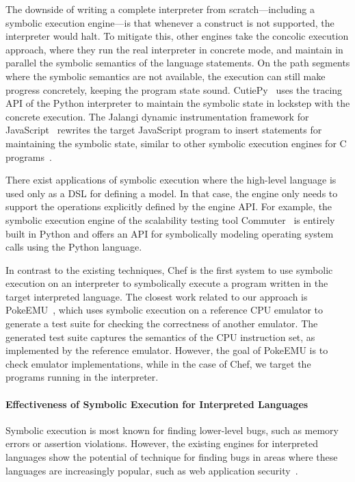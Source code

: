 The downside of writing a complete interpreter from scratch---including a symbolic execution engine---is that whenever a construct is not supported, the interpreter would halt.  To mitigate this, other engines take the concolic execution approach, where they run the real interpreter in concrete mode, and maintain in parallel the symbolic semantics of the language statements.  On the path segments where the symbolic semantics are not available, the execution can still make progress concretely, keeping the program state sound.  CutiePy~\cite{cutie-py} uses the tracing API of the Python interpreter to maintain the symbolic state in lockstep with the concrete execution.  The Jalangi dynamic instrumentation framework for JavaScript~\cite{jalangi} rewrites the target JavaScript program to insert statements for maintaining the symbolic state, similar to other symbolic execution engines for C programs~\cite{dart,cute,exe}.

There exist applications of symbolic execution where the high-level language is used only as a DSL for defining a model.  In that case, the engine only needs to support the operations explicitly defined by the engine API.  For example, the symbolic execution engine of the scalability testing tool Commuter~\cite{commuter} is entirely built in Python and offers an API for symbolically modeling operating system calls using the Python language.

In contrast to the existing techniques, Chef is the first system to use symbolic execution on an interpreter to symbolically execute a program written in the target interpreted language.  The closest work related to our approach is PokeEMU~\cite{hifi-lofi}, which uses symbolic execution on a reference CPU emulator to generate a test suite for checking the correctness of another emulator.  The generated test suite captures the semantics of the CPU instruction set, as implemented by the reference emulator.  However, the goal of PokeEMU is to check emulator implementations, while in the case of Chef, we target the programs running in the interpreter.

\paragraph{Effectiveness of Symbolic Execution for Interpreted Languages}

Symbolic execution is most known for finding lower-level bugs, such as memory errors or assertion violations.  However, the existing engines for interpreted languages show the potential of technique for finding bugs in areas where these languages are increasingly popular, such as web application security~\cite{saxena-kudzu,artzi-apollo, kiezun-ardilla}.

